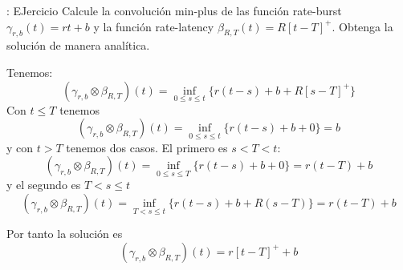 \documentclass[xcolor={x11names}]{beamer}
\begin{document}
\begin{frame}{\secname: EJercicio}
Calcule la convolución min-plus
de las función rate-burst
$\gamma_{r,b}(t)=rt+b$
y la función rate-latency
$\beta_{R,T}(t)=R[t-T]^+$.
Obtenga la solución de manera analítica.


Tenemos:
\begin{equation*}
(\gamma_{r,b}\otimes \beta_{R,T})(t)
=\inf_{0\leq s \leq t}\{r(t-s)+b+R[s-T]^+\}
\end{equation*}
Con $t\leq T$ tenemos
\begin{equation*}
(\gamma_{r,b}\otimes \beta_{R,T})(t)
=\inf_{0\leq s \leq t}\{r(t-s)+b+0\}=b
\end{equation*}
y con $t>T$ tenemos dos casos.
El primero es $s<T<t$:
\begin{equation*}
(\gamma_{r,b}\otimes \beta_{R,T})(t)
=\inf_{0\leq s \leq T}\{r(t-s)+b+0\}=r(t-T)+b
\end{equation*}
y el segundo es $T<s\leq t$
\begin{equation*}
(\gamma_{r,b}\otimes \beta_{R,T})(t)
=\inf_{T< s \leq t}\{r(t-s)+b+R(s-T)\}=r(t-T)+b
\end{equation*}

Por tanto la solución es
\begin{equation*}
(\gamma_{r,b}\otimes \beta_{R,T})(t)
=r[t-T]^++b
\end{equation*}

\end{frame}
\end{document}
